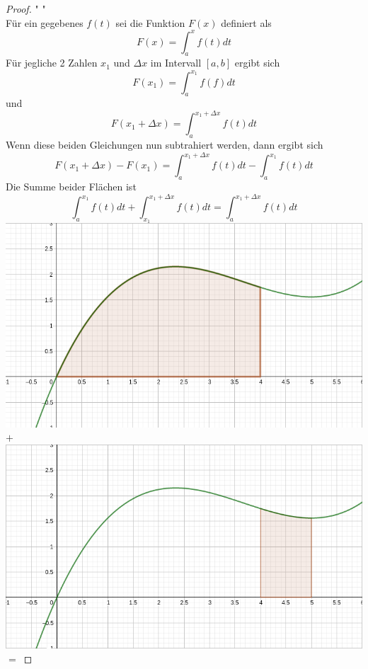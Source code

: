 \documentclass[fontsize=12pt,paper=a4,DIV12,cleardoublepage=empty, 
liststotoc,idxtotoc,bibtotoc]{article}
\theoremstyle{plain}
\theoremstyle{definition}
\begin{document}
	\begin{proof}" "\\
		Für ein gegebenes $f(t)$ sei die Funktion $F(x)$ definiert als
		\begin{equation*}
			F(x)=\int_{a}^{x}f(t)dt
		\end{equation*}
		Für jegliche 2 Zahlen $x_1$ und $\Delta x$ im Intervall $[a, b]$ ergibt sich
		\begin{equation*}
			F(x_1)=\int_{a}^{x_1}f(f)dt
		\end{equation*}
		und
		\begin{equation*}
			F(x_1+\Delta x)=\int_{a}^{x_1+\Delta x}f(t)dt
		\end{equation*}
		Wenn diese beiden Gleichungen nun subtrahiert werden, dann ergibt sich
		\begin{equation}
			F(x_1+\Delta x)-F(x_1)=\int_{a}^{x_1+\Delta x}f(t)dt-\int_{a}^{x_1}f(t)dt
		\end{equation}
		Die Summe beider Flächen ist
		\begin{equation*}
			\int_{a}^{x_1}f(t)dt + \int_{x_1}^{x_1+\Delta x}f(t)dt = \int_{a}^{x_1+\Delta x}f(t)dt
		\end{equation*}
		\includegraphics[scale=0.2]{Integral 0-4.png} $+$
		\includegraphics[scale=0.2]{Integral 4-5.png} $=$

\end{proof}
\end{document}
